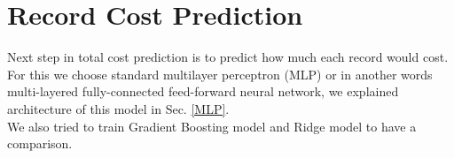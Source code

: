 
\section{Record Cost Prediction}
\label{recCostPred}

Next step in total cost prediction is to predict how much each record would cost. For this we choose standard multilayer perceptron (MLP) or in another words multi-layered fully-connected feed-forward neural network, we explained architecture of this model in Sec. \ref{MLP}. 
\\

We also tried to train Gradient Boosting model and Ridge model to have a comparison.